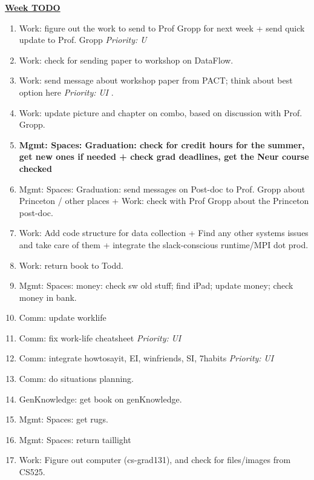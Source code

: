 \documentclass[serif,mathserif,final]{beamer}
\newcommand{\priority}[1]{\textit{Priority:} \textit{#1}}
\begin{document}
\begin{frame}{}
\begin{columns}[t]
\begin{column}{0.33\linewidth}{\textbf{\underline{Week TODO}}}
\begin{block}
\begin{enumerate}
\item \tiny Work: figure out the work to send to Prof Gropp for next week + 
send quick update to Prof. Gropp \priority{U}
\item \tiny Work: check for sending paper to workshop on DataFlow. 
\item \tiny Work: send message about workshop paper from PACT; think about best option here \priority{UI} .
\item \tiny Work: update picture and chapter on combo, based on discussion with Prof. Gropp. 
\item \tiny \textbf{Mgmt: Spaces: Graduation: check for credit hours for the summer, get new ones if needed + check grad deadlines, get the Neur course checked} 
\item \tiny Mgmt: Spaces: Graduation: send messages on Post-doc to Prof. Gropp about Princeton / other places + Work: check with Prof Gropp about the Princeton post-doc. 
\item \tiny Work: Add code structure for data collection + Find any other systems issues and take care of them + integrate the slack-conscious runtime/MPI dot prod. 

\item \tiny Work: return book to Todd. 

\item \tiny Mgmt: Spaces: money: check sw old stuff; find iPad; update
  money; check money in bank. 

\item \tiny Comm: update worklife 
\item \tiny Comm: fix work-life cheatsheet \priority{UI} 
\item \tiny Comm: integrate howtosayit, EI, winfriends, SI, 7habits
  \priority{UI} 

\item \tiny Comm: do situations planning. 
\item \tiny GenKnowledge: get book on genKnowledge. 
\item \tiny Mgmt: Spaces: get rugs. 
\item \tiny Mgmt: Spaces: return taillight 

\item \tiny Work: Figure out computer (cs-grad131), and check for files/images from CS525. 
\end{enumerate}
\end{block} 

\begin{block} 


\end{block}
\end{column}
\end{columns}
\end{frame}
\end{document}

